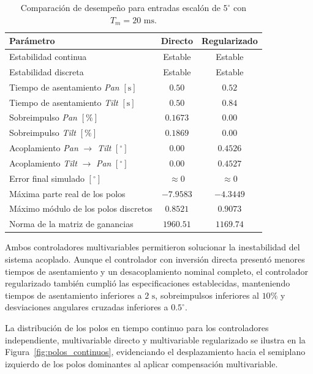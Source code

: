 \documentclass[12pt,a4paper]{article}
\begin{document}
\begin{table}[H]
    \centering
    \caption{Comparación de desempeño para entradas escalón de $5^\circ$ con $T_m = 20\text{ ms}$.}
    \label{tab:comparacion_mimo}
    \begin{tabular}{lcc}
        \toprule
        \textbf{Parámetro} & \textbf{Directo} & \textbf{Regularizado} \\
        \midrule
        Estabilidad continua & Estable & Estable \\
        Estabilidad discreta & Estable & Estable \\
        Tiempo de asentamiento \emph{Pan} $[\text{s}]$ & $0.50$ & $0.52$ \\
        Tiempo de asentamiento \emph{Tilt} $[\text{s}]$ & $0.50$ & $0.84$ \\
        Sobreimpulso \emph{Pan} $[\%]$ & $0.1673$ & $0.00$ \\
        Sobreimpulso \emph{Tilt} $[\%]$ & $0.1869$ & $0.00$ \\
        Acoplamiento \emph{Pan} $\rightarrow$ \emph{Tilt} $[{}^\circ]$ & $0.00$ & $0.4526$ \\
        Acoplamiento \emph{Tilt} $\rightarrow$ \emph{Pan} $[{}^\circ]$ & $0.00$ & $0.4527$ \\
        Error final simulado $[{}^\circ]$ & $\approx 0$ & $\approx 0$ \\
        Máxima parte real de los polos & $-7.9583$ & $-4.3449$ \\
        Máximo módulo de los polos discretos & $0.8521$ & $0.9073$ \\
        Norma de la matriz de ganancias & $1960.51$ & $1169.74$ \\
        \bottomrule
    \end{tabular}
\end{table}

Ambos controladores multivariables permitieron solucionar la inestabilidad del sistema acoplado. Aunque el controlador con inversión directa presentó menores tiempos de asentamiento y un desacoplamiento nominal completo, el controlador regularizado también cumplió las especificaciones establecidas, manteniendo tiempos de asentamiento inferiores a $2\text{ s}$, sobreimpulsos inferiores al $10\%$ y desviaciones angulares cruzadas inferiores a $0.5^\circ$.

La distribución de los polos en tiempo continuo para los controladores independiente, multivariable directo y multivariable regularizado se ilustra en la Figura~\ref{fig:polos_continuos}, evidenciando el desplazamiento hacia el semiplano izquierdo de los polos dominantes al aplicar compensación multivariable.
\end{document}
